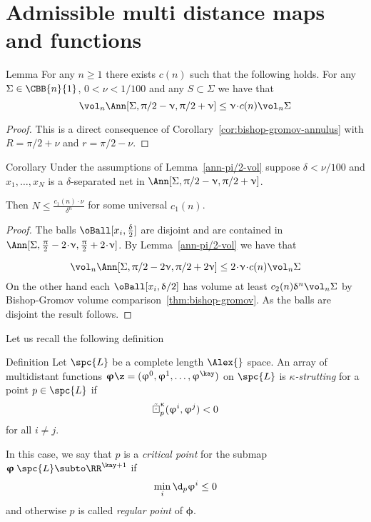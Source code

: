 \section{Admissible multi distance maps and functions}

\begin{thm}{Lemma}\label{ann-pi/2-vol}
For any $n\ge 1$ there exists $c(n)$ such that the following holds. For any
$\Sigma\in\CBB{n}{1}$, $0<\nu<1/100$ and any $S\subset \Sigma$ we have that
\[
\vol_n \Ann[\Sigma, \pi/2-\nu,\pi/2+\nu]\le \nu\cdot c(n)\vol_n\Sigma
\]
\end{thm}
\begin{proof}
This is a direct consequence of Corollary~\ref{cor:bishop-gromov-annulus}
with $R=\pi/2+\nu$ and $r=\pi/2-\nu$.
\end{proof}
\begin{thm}{Corollary}
Under the assumptions of Lemma~\ref{ann-pi/2-vol} suppose $\delta<\nu/100$ and $x_1,\ldots,x_N$ is a $\delta$-separated net in $\Ann[\Sigma, \pi/2-\nu,\pi/2+\nu]$.

Then $N\le \frac{c_1(n)\cdot\nu}{\delta^n}$ for some universal $c_1(n)$.
\end{thm}
\begin{proof}
The balls $\oBall[x_i,\tfrac\delta2]$ are disjoint and are contained in $\Ann[\Sigma, \tfrac\pi2-2\cdot\nu,\tfrac\pi2+2\cdot\nu]$. 
By Lemma~\ref{ann-pi/2-vol} we have that 

\[
\vol_n\Ann[\Sigma, \pi/2-2\nu,\pi/2+2\nu]\le 2\cdot \nu\cdot c(n)\vol_n\Sigma
\]
On the other hand each $\oBall[x_i,\delta/2]$ has volume at least $c_2(n)\delta^n\vol_n\Sigma$ by Bishop-Gromov volume comparison~\ref{thm:bishop-gromov}.
As the balls are disjoint the result follows.
\end{proof}

Let us recall the following definition


\begin{thm}{Definition}\label{def:strut-II}
Let $\spc{L}$ be a complete length $\Alex{}$ space.
An array of multidistant functions 
$\bm{\phi}\z=(\phi^0,\phi^1,\dots,\phi^\kay)$
on $\spc{L}$
is \emph{$\kappa$-strutting} for a point $p\in\spc{L}$ if 
\[\tilde\boxdot^{\upkappa}_p({\upvarphi^i},{\upvarphi^j})<0\]
for all $i\not=j$.

In this case, we say that $p$ is a 
\emph{critical point} 
for the submap $\bm{\phi}\:\spc{L}\subto \RR^{\kay+1}$
if
\[\min_i\d_p\phi^i\le 0\]
and otherwise $p$ is called 
\emph{regular point} of $\bm{\phi}$.
\end{thm} 

